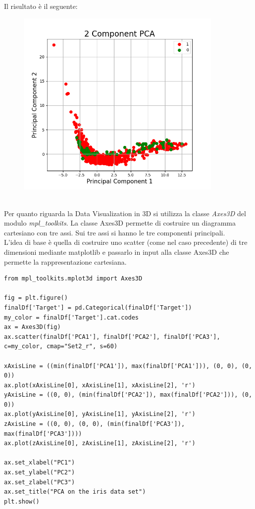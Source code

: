 Il risultato è il seguente:\\
\begin{figure}[h]
	\centering   	
	\includegraphics[width=100mm]{image/scatter2d.png}
\end{figure}
\\Per quanto riguarda la Data Visualization in 3D si utilizza la classe \textit{Axes3D} del modulo \textit{mpl\_toolkits}. La classe Axes3D permette di costruire un diagramma cartesiano con tre assi. Sui tre assi si hanno le tre componenti principali.\\
L'idea di base è quella di costruire uno scatter (come nel caso precedente) di tre dimensioni mediante matplotlib e passarlo in input alla classe Axes3D che permette la rappresentazione cartesiana.
\begin{lstlisting}
from mpl_toolkits.mplot3d import Axes3D

fig = plt.figure()
finalDf['Target'] = pd.Categorical(finalDf['Target'])
my_color = finalDf['Target'].cat.codes
ax = Axes3D(fig)
ax.scatter(finalDf['PCA1'], finalDf['PCA2'], finalDf['PCA3'], c=my_color, cmap="Set2_r", s=60)

xAxisLine = ((min(finalDf['PCA1']), max(finalDf['PCA1'])), (0, 0), (0, 0))
ax.plot(xAxisLine[0], xAxisLine[1], xAxisLine[2], 'r')
yAxisLine = ((0, 0), (min(finalDf['PCA2']), max(finalDf['PCA2'])), (0, 0))
ax.plot(yAxisLine[0], yAxisLine[1], yAxisLine[2], 'r')
zAxisLine = ((0, 0), (0, 0), (min(finalDf['PCA3']), max(finalDf['PCA3'])))
ax.plot(zAxisLine[0], zAxisLine[1], zAxisLine[2], 'r')

ax.set_xlabel("PC1")
ax.set_ylabel("PC2")
ax.set_zlabel("PC3")
ax.set_title("PCA on the iris data set")
plt.show()
\end{lstlisting}
